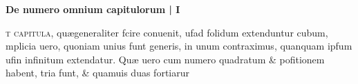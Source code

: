 \vspace*{22mm}
\begin{center}
{\bfseries\large De numero omnium capitulorum | I}
\end{center}

\lettrine[lines=6,nindent=0pt,findent=5pt,lraise=-0.15,depth=1]{\color{VioletRed4}}{t capitula,} qu\ae generaliter fcire conuenit, uf\que ad folidum extenduntur cubum, {\jfi}mplicia uero, quoniam unius funt generis, in unum contraximus, quanquam ipfum uf\que in infinitum extendatur. Qu{\ae} uero cum numero quadratum \& pofitionem habent, tria funt, \& quamuis duas fortiarur 